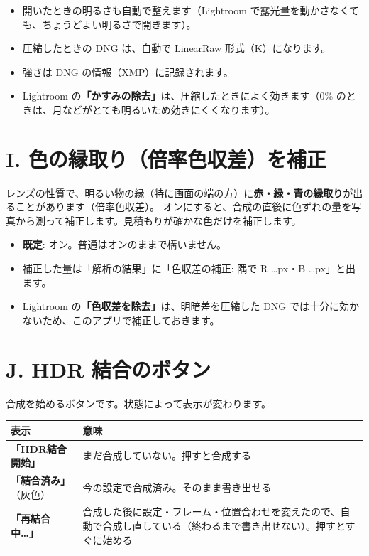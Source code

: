 \documentclass[paper=a4paper,fontsize=11pt,report,jafontsize=11pt]{jlreq}
\newcommand{\ui}[1]{\textsf{\textbf{「#1」}}}
\begin{document}
\begin{memo}
\begin{itemize}
  \item 開いたときの明るさも自動で整えます（Lightroom で露光量を動かさなくても、ちょうどよい明るさで開きます）。
  \item 圧縮したときの DNG は、自動で LinearRaw 形式（K）になります。
  \item 強さは DNG の情報（XMP）に記録されます。
  \item Lightroom の\ui{かすみの除去}は、圧縮したときによく効きます（0\% のときは、月などがとても明るいため効きにくくなります）。
\end{itemize}
\end{memo}

\section{I. 色の縁取り（倍率色収差）を補正}
レンズの性質で、明るい物の縁（特に画面の端の方）に\textbf{赤・緑・青の縁取り}が出ることがあります（倍率色収差）。
オンにすると、合成の直後に色ずれの量を写真から測って補正します。見積もりが確かな色だけを補正します。
\begin{itemize}
  \item \textbf{既定}: オン。普通はオンのままで構いません。
  \item 補正した量は「解析の結果」に「色収差の補正: 隅で R …px・B …px」と出ます。
  \item Lightroom の\ui{色収差を除去}は、明暗差を圧縮した DNG では十分に効かないため、このアプリで補正しておきます。
\end{itemize}

\section{J. HDR 結合のボタン}
合成を始めるボタンです。状態によって表示が変わります。

\noindent\begin{tabularx}{\linewidth}{l X}
\toprule
表示 & 意味 \\ \midrule
\ui{HDR結合開始} & まだ合成していない。押すと合成する \\
\ui{結合済み}（灰色） & 今の設定で合成済み。そのまま書き出せる \\
\ui{再結合中…} & 合成した後に設定・フレーム・位置合わせを変えたので、自動で合成し直している（終わるまで書き出せない）。押すとすぐに始める \\
\bottomrule
\end{tabularx}
\end{document}
